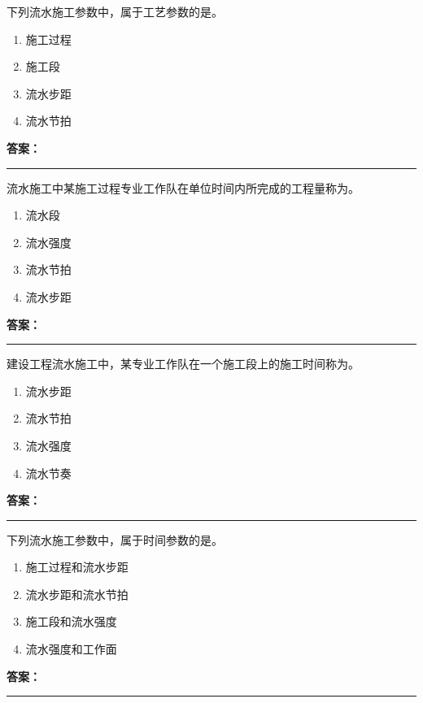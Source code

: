 \documentclass[UTF8,fontset=fandol,11pt]{ctexart}
\newcommand{\answerline}{\textcolor{answerred}{\rule{2.4cm}{0.7pt}}}
\begin{document}
\begin{quizbox}[title={第 3 题}]
下列流水施工参数中，属于工艺参数的是。\\
\begin{enumerate}[label=\Alph*.]
\item 施工过程
\item 施工段
\item 流水步距
\item 流水节拍
\end{enumerate}
\textbf{\textcolor{answerred}{答案：}} \answerline
\end{quizbox}

\begin{quizbox}[title={第 4 题}]
流水施工中某施工过程专业工作队在单位时间内所完成的工程量称为。\\
\begin{enumerate}[label=\Alph*.]
\item 流水段
\item 流水强度
\item 流水节拍
\item 流水步距
\end{enumerate}
\textbf{\textcolor{answerred}{答案：}} \answerline
\end{quizbox}

\begin{quizbox}[title={第 5 题}]
建设工程流水施工中，某专业工作队在一个施工段上的施工时间称为。\\
\begin{enumerate}[label=\Alph*.]
\item 流水步距
\item 流水节拍
\item 流水强度
\item 流水节奏
\end{enumerate}
\textbf{\textcolor{answerred}{答案：}} \answerline
\end{quizbox}

\begin{quizbox}[title={第 6 题}]
下列流水施工参数中，属于时间参数的是。\\
\begin{enumerate}[label=\Alph*.]
\item 施工过程和流水步距
\item 流水步距和流水节拍
\item 施工段和流水强度
\item 流水强度和工作面
\end{enumerate}
\textbf{\textcolor{answerred}{答案：}} \answerline
\end{quizbox}
\end{document}
